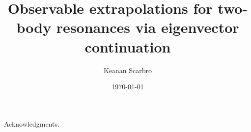 \documentclass[aps,prc,preprint,groupedaddress]{revtex4-2}
\begin{document}
    \title{Observable extrapolations for two-body resonances via eigenvector continuation}
    \author{Keanan Scarbro}
    \date{\today}

    
    \maketitle
    
    
    
    
    

    \begin{acknowledgments}
    Acknowledgments.
    \end{acknowledgments}
    
    
    
\end{document}
